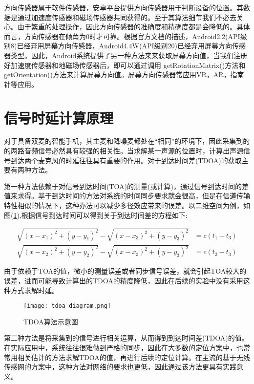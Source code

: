 \documentclass[winfonts]{njuthesis}
\begin{document}
		方向传感器属于软件传感器，安卓平台提供方向传感器用于判断设备的位置。其数据是通过加速度传感器和磁场传感器共同获得的。至于其算法细节我们不必去关心。由于繁重的处理操作，因此方向传感器的准确度和精确度都是会降低的。具体而言，方向传感器在倾角为0时才可靠。根据官方文档的描述，Android2.2(API级别8)已经弃用屏幕方向传感器，Android4.4W(API级别20)已经弃用屏幕方向传感器类型。因此，Android系统提供了另一种方法来来获取屏幕方向值，当我们注册好加速度传感器和地磁场传感器后，即可以通过调用 getRotationMatrix()方法和 getOrientation()方法来计算屏幕方向值。屏幕方向传感器常应用VR，AR，指南针等应用。

	
	\section{信号时延计算原理}
	
		对于具备双麦的智能手机，其主麦和降噪麦都处在“相同”的环境下，因此采集到的的两路音频信号必然具有较强的相关性。当求解某一声源的位置时，计算出声源信号到达两个麦克风的时延往往具有重要的作用。对于到达时间差(TDOA)的获取主要有两种方法。
		
		第一种方法依赖于对信号到达时间(TOA)的测量(或计算)，通过信号到达时间的差值来求得。基于到达时间的方法对系统的时间同步要求就会很高，但是在信道传输特性相似的情况下，这种办法可以减少多径效应带来的误差。以二维空间为例，如图(\ref{fig: tdoa-diagram}),根据信号到达时间可以得到关于到达时间差的方程如下:
		
		\begin{align}
			\sqrt{(x-x_1)^2+(y-y_1)^2} - \sqrt{(x-x_3)^2+(y-y_3)^2} &= c(t_1-t_3)\\
			\sqrt{(x-x_2)^2+(y-y_2)^2} - \sqrt{(x-x_3)^2+(y-y_3)^2} &= c(t_2-t_3)
		\end{align}
		
		由于依赖于TOA的值，微小的测量误差或者同步信号误差，就会引起TOA较大的误差，进而可能导致计算出的TDOA的精度降低，因此在后续的实验中没有采用这种方式求解时延。
		
		\begin{figure}[H]
			\centering
			\texttt{[image: tdoa\_diagram.png]} 
			\caption{TDOA算法示意图}
			\label{fig: tdoa-diagram}
		\end{figure}
		
		
		第二种方法是将采集到的信号进行相关运算，从而得到到达时间差(TDOA)的值。在实际应用中，系统往往很难做到严格的同步，因此在大多数的定位方案中，也常常用相关估计的方法求解TDOA的值，再进行后续的定位计算。在主流的基于无线传感网的方案中，这种方法对网络的要求也更低，因此通过该方法更具有实践意义。
		
\end{document}
